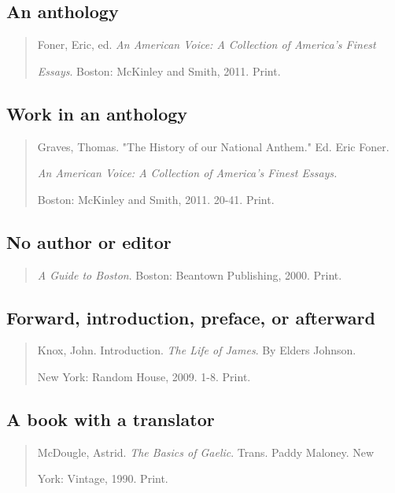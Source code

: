 \subsection{An anthology}
\begin{quote}
Foner, Eric, ed. \emph{An American Voice: A Collection of America's Finest}

\hspace{.4in}\emph{Essays}. Boston: McKinley and Smith, 2011. Print.

\end{quote}

\subsection{Work in an anthology}

\begin{quote}
Graves, Thomas. "The History of our National Anthem." Ed. Eric Foner. 

\hspace{.4in}\emph{An American Voice: A Collection of America's Finest Essays.}

\hspace{.4in}Boston: McKinley and Smith, 2011. 20-41. Print.

\end{quote}

\subsection{No author or editor}

\begin{quote}
\emph{A Guide to Boston}. Boston: Beantown Publishing, 2000. Print.
\end{quote}

\subsection{Forward, introduction, preface, or afterward}
\begin{quote}

Knox, John. Introduction. \emph{The Life of James}. By Elders Johnson.

\hspace{.4in}New York: Random House, 2009. 1-8. Print.

\end{quote}

\subsection{A book with a translator} 
\begin{quote}
McDougle, Astrid. \emph{The Basics of Gaelic}. Trans. Paddy Maloney. New

\hspace{.4in}York: Vintage, 1990. Print.
\end{quote}


